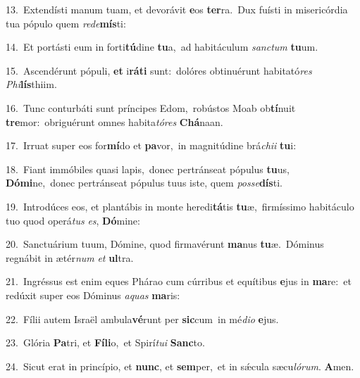 {\numbfont\textcolor{\numbcolor}{13.}}~Extendísti manum tuam, et devorávit \textbf{e}\-os \textbf{ter}\-ra.~\star Dux fuísti in misericórdia tua pópulo quem \textit{red}\-\textit{e}\textbf{mís}ti:\par
{\numbfont\textcolor{\numbcolor}{14.}}~Et portásti eum in forti\-\textbf{tú}\-dine \textbf{tu}\-a,~\star ad habitáculum \textit{sanc}\-\textit{tum} \textbf{tu}\-um.\par
{\numbfont\textcolor{\numbcolor}{15.}}~Ascendérunt pópuli, \textbf{et} i\-\textbf{rá}\-\textbf{ti} sunt:~\star dolóres obtinuérunt habitató\textit{res} \textit{Phi}\-\textbf{lís}thiim.\par
{\numbfont\textcolor{\numbcolor}{16.}}~Tunc conturbáti sunt príncipes Edom,~\dagger robústos Moab ob\-\textbf{tí}\-nuit \textbf{tre}\-mor:~\star obriguérunt omnes habita\-\textit{tó}\-\textit{res} \textbf{Chá}\-naan.\par
{\numbfont\textcolor{\numbcolor}{17.}}~Irruat super eos for\-\textbf{mí}\-do et \textbf{pa}\-vor,~\star in magnitúdine brá\-\textit{chi}\-\textit{i} \textbf{tu}\-i:\par
{\numbfont\textcolor{\numbcolor}{18.}}~Fiant immóbiles quasi lapis,~\dagger donec pertránseat pópulus \textbf{tu}\-us, \textbf{Dó}\-\textbf{mi}ne,~\star donec pertránseat pópulus tuus iste, quem \textit{pos}\-\textit{se}\textbf{dís}ti.\par
{\numbfont\textcolor{\numbcolor}{19.}}~Introdúces eos, et plantábis in monte heredi\-\textbf{tá}\-tis \textbf{tu}\-æ,~\star firmíssimo habitáculo tuo quod operá\textit{tus} \textit{es}\-, \textbf{Dó}\-mine:\par
{\numbfont\textcolor{\numbcolor}{20.}}~Sanctuárium tuum, Dómine, quod firmavérunt \textbf{ma}\-nus \textbf{tu}\-æ.~\star Dóminus regnábit in ætér\textit{num} \textit{et} \textbf{ul}\-tra.\par
{\numbfont\textcolor{\numbcolor}{21.}}~Ingréssus est enim eques Phárao cum cúrribus et equítibus \textbf{e}\-jus in \textbf{ma}\-re:~\star et redúxit super eos Dóminus \textit{a}\-\textit{quas} \textbf{ma}\-ris:\par
{\numbfont\textcolor{\numbcolor}{22.}}~Fílii autem Israël ambula\-\textbf{vé}\-runt per \textbf{sic}\-cum~\star in mé\-\textit{di}\-\textit{o} \textbf{e}\-jus.\par
{\numbfont\textcolor{\numbcolor}{23.}}~Glória \textbf{Pa}\-tri, et \textbf{Fí}\-\textbf{li}o,~\star et Spirí\-\textit{tu}\-\textit{i} \textbf{Sanc}\-to.\par
{\numbfont\textcolor{\numbcolor}{24.}}~Sicut erat in princípio, et \textbf{nunc}\-, et \textbf{sem}\-per,~\star et in sǽcula sæcu\-\textit{ló}\-\textit{rum}. \textbf{A}\-men.\par
